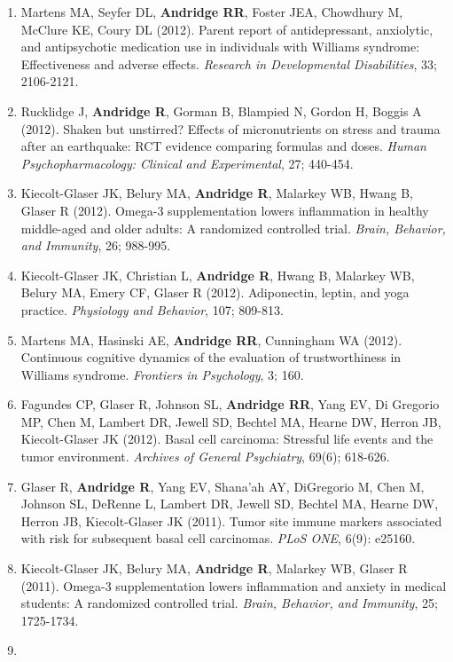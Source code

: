 \documentclass[
  english,
  letterpaper,
  DIV=11,
  numbers=noendperiod]{scrartcl}
\begin{document}
\begin{enumerate}
  smoking history. \emph{Psychoneuroendocrinology}, 38; 179-187.
\item
  Martens MA, Seyfer DL, \textbf{Andridge RR}, Foster JEA, Chowdhury M,
  McClure KE, Coury DL (2012). Parent report of antidepressant,
  anxiolytic, and antipsychotic medication use in individuals with
  Williams syndrome: Effectiveness and adverse effects. \emph{Research
  in Developmental Disabilities}, 33; 2106-2121.
\item
  Rucklidge J, \textbf{Andridge R}, Gorman B, Blampied N, Gordon H,
  Boggis A (2012). Shaken but unstirred? Effects of micronutrients on
  stress and trauma after an earthquake: RCT evidence comparing formulas
  and doses. \emph{Human Psychopharmacology: Clinical and Experimental},
  27; 440-454.
\item
  Kiecolt-Glaser JK, Belury MA, \textbf{Andridge R}, Malarkey WB, Hwang
  B, Glaser R (2012). Omega-3 supplementation lowers inflammation in
  healthy middle-aged and older adults: A randomized controlled trial.
  \emph{Brain, Behavior, and Immunity}, 26; 988-995.
\item
  Kiecolt-Glaser JK, Christian L, \textbf{Andridge R}, Hwang B, Malarkey
  WB, Belury MA, Emery CF, Glaser R (2012). Adiponectin, leptin, and
  yoga practice. \emph{Physiology and Behavior}, 107; 809-813.
\item
  Martens MA, Hasinski AE, \textbf{Andridge RR}, Cunningham WA (2012).
  Continuous cognitive dynamics of the evaluation of trustworthiness in
  Williams syndrome. \emph{Frontiers in Psychology}, 3; 160.
\item
  Fagundes CP, Glaser R, Johnson SL, \textbf{Andridge RR}, Yang EV, Di
  Gregorio MP, Chen M, Lambert DR, Jewell SD, Bechtel MA, Hearne DW,
  Herron JB, Kiecolt-Glaser JK (2012). Basal cell carcinoma: Stressful
  life events and the tumor environment. \emph{Archives of General
  Psychiatry}, 69(6); 618-626.
\item
  Glaser R, \textbf{Andridge R}, Yang EV, Shana'ah AY, DiGregorio M,
  Chen M, Johnson SL, DeRenne L, Lambert DR, Jewell SD, Bechtel MA,
  Hearne DW, Herron JB, Kiecolt-Glaser JK (2011). Tumor site immune
  markers associated with risk for subsequent basal cell carcinomas.
  \emph{PLoS ONE}, 6(9): e25160.
\item
  Kiecolt-Glaser JK, Belury MA, \textbf{Andridge R}, Malarkey WB, Glaser
  R (2011). Omega-3 supplementation lowers inflammation and anxiety in
  medical students: A randomized controlled trial. \emph{Brain,
  Behavior, and Immunity}, 25; 1725-1734.
\item

\end{enumerate}
\end{document}
